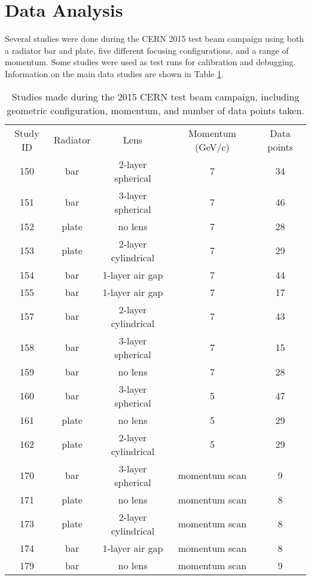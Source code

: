 \clearpage
\section{Data Analysis}
Several studies were done during the CERN 2015 test beam campaign using both a radiator bar and plate, five different focusing configurations, and a range of momentum. Some studies were used as test runs for calibration and debugging. Information on the main data studies are shown in Table \ref{tab:runs2015}.

\begin{table}[]
\centering
\caption{Studies made during the 2015 CERN test beam campaign, including geometric configuration, momentum, and number of data points taken.}
\label{tab:runs2015}
\begin{tabular}{ccccc}
Study ID & Radiator & Lens & Momentum (GeV/c) & Data points \\
150 & bar & 2-layer spherical & 7 & 34 \\
151 & bar & 3-layer spherical & 7 & 46 \\
152 & plate & no lens & 7 & 28 \\
153 & plate & 2-layer cylindrical & 7 & 29 \\
154 & bar & 1-layer air gap & 7 & 44 \\
155 & bar & 1-layer air gap & 7 & 17 \\
157 & bar & 2-layer cylindrical & 7 & 43 \\
158 & bar & 3-layer spherical & 7 & 15 \\
159 & bar & no lens & 7 & 28 \\
160 & bar & 3-layer spherical & 5 & 47 \\
161 & plate & no lens & 5 & 29 \\
162 & plate & 2-layer cylindrical & 5 & 29 \\
170 & bar & 3-layer spherical & momentum scan & 9 \\
171 & plate & no lens & momentum scan & 8 \\
173 & plate & 2-layer cylindrical & momentum scan & 8 \\
174 & bar & 1-layer air gap & momentum scan & 8 \\
179 & bar & no lens & momentum scan & 9 \\
\end{tabular}
\end{table}



